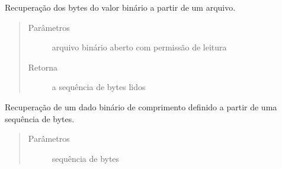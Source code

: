 \documentclass[letterpaper,10pt,brazil]{sphinxmanual}
\begin{document}
\begin{fulllineitems}
\begin{fulllineitems}
\begin{quote}
\begin{description}
\end{description}\end{quote}

\end{fulllineitems}


\begin{fulllineitems}
\label{\detokenize{estrutarq.dado:estrutarq.dado.DadoBinario.leia_de_arquivo}}
\pysigstartsignatures
{}
\pysigstopsignatures
\sphinxAtStartPar
Recuperação dos bytes do valor binário a partir de um arquivo.
\begin{quote}\begin{description}
\item[{Parâmetros}] \leavevmode
\sphinxAtStartPar
{} \textendash{} arquivo binário aberto com permissão de leitura

\item[{Retorna}] \leavevmode
\sphinxAtStartPar
a sequência de bytes lidos

\end{description}\end{quote}

\end{fulllineitems}


\begin{fulllineitems}
\label{\detokenize{estrutarq.dado:estrutarq.dado.DadoBinario.leia_de_bytes}}
\pysigstartsignatures
{}
\pysigstopsignatures
\sphinxAtStartPar
Recuperação de um dado binário de comprimento definido a partir de
uma sequência de bytes.
\begin{quote}\begin{description}
\item[{Parâmetros}] \leavevmode
\sphinxAtStartPar
{} \textendash{} sequência de bytes


\end{description}
\end{quote}
\end{fulllineitems}
\end{fulllineitems}
\end{document}
